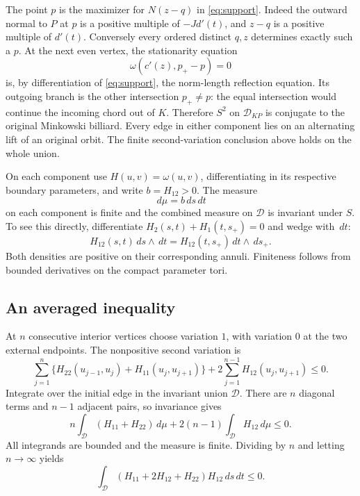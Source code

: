 \documentclass[11pt]{amsart}
\theoremstyle{remark}
\newcommand{\dd}{\,d}
\begin{document}
The point $p$ is the maximizer for $N(z-q)$ in \eqref{eq:support}.
Indeed the outward normal to $P$ at $p$ is a positive multiple of
$-Jd'(t)$, and $z-q$ is a positive multiple of $d'(t)$.
Conversely every ordered distinct $q,z$ determines exactly such a $p$.
At the next even vertex, the stationarity equation
\[
\omega(c'(z),p_+-p)=0
\]
is, by differentiation of \eqref{eq:support}, the norm-length reflection
equation. Its outgoing branch is the other intersection $p_+\ne p$:
the equal intersection would continue the incoming chord out of $K$.
Therefore $S^2$ on $\mathcal D_{KP}$ is conjugate to the original
Minkowski billiard. Every edge in either component lies on an alternating
lift of an original orbit. The finite second-variation conclusion above
holds on the whole union.

On each component use $H(u,v)=\omega(u,v)$, differentiating in its
respective boundary parameters, and write $b=H_{12}>0$.
The measure
\begin{equation}\label{eq:measure}
\dd\mu=b\dd s\dd t
\end{equation}
on each component is finite and the combined measure on $\mathcal D$
is invariant under $S$. To see this directly, differentiate
$H_2(s,t)+H_1(t,s_+)=0$ and wedge with $\dd t$:
\[
H_{12}(s,t)\dd s\wedge\dd t
=H_{12}(t,s_+)\dd t\wedge\dd s_+.
\]
Both densities are positive on their corresponding annuli.
Finiteness follows from bounded derivatives on the compact parameter tori.

\subsection{An averaged inequality}

At $n$ consecutive interior vertices choose variation $1$, with variation
$0$ at the two external endpoints. The nonpositive second variation is
\[
\sum_{j=1}^n\{H_{22}(u_{j-1},u_j)+H_{11}(u_j,u_{j+1})\}
+2\sum_{j=1}^{n-1}H_{12}(u_j,u_{j+1})\leq0.
\]
Integrate over the initial edge in the invariant union $\mathcal D$.
There are $n$ diagonal terms and $n-1$ adjacent pairs, so invariance gives
\[
n\int_{\mathcal D}(H_{11}+H_{22})\dd\mu
+2(n-1)\int_{\mathcal D}H_{12}\dd\mu\leq0.
\]
All integrands are bounded and the measure is finite. Dividing by $n$
and letting $n\to\infty$ yields
\begin{equation}\label{eq:average}
\int_{\mathcal D}(H_{11}+2H_{12}+H_{22})H_{12}\dd s\dd t\leq0.
\end{equation}
\end{document}
